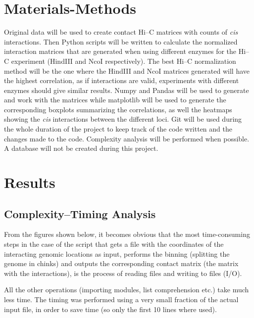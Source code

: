 \documentclass[a4paper, 11pt]{article} %
\begin{document}

\section*{Materials-Methods}
Original data will be used to create contact Hi--C matrices
with counts of \emph{cis} interactions. Then Python scripts
will be written to calculate the normalized interaction matrices that 
are generated when using different enzymes for the Hi--C experiment
(HindIII and NcoI respectively). The best Hi--C normalization method
will be the one where the HindIII and NcoI matrices generated will
have the highest correlation, as if interactions are valid, experiments
with different enzymes should give similar results. 
Numpy and Pandas will be used to generate
and work with the matrices while matplotlib will be used to generate
the corresponding boxplots summarizing the correlations, as well
the heatmaps showing the \emph{cis} interactions between the different
loci. Git will be used during the whole duration of the project to keep track
of the code written and the changes made to the code. Complexity
analysis will be performed when possible. A database will not be created
during this project.
\label{sec:methods}




\section*{Results}

\subsection*{Complexity--Timing Analysis}

From the figures shown below, it becomes obvious that
the most time-consuming steps in the case of the script 
that gets a file with the coordinates of the interacting
genomic locations as input, performs the binning (splitting
the genome in chinks) and outputs the corresponding contact 
matrix (the matrix with the interactions), is the process
of reading files and writing to files (I/O).

All the other operations (importing modules, list comprehension etc.) take much less time. The timing was performed using a very
small fraction of the actual input file, in order to save
time (so only the first 10 lines where used). 
\end{document}

